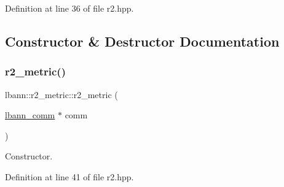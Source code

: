 Definition at line 36 of file r2.\+hpp.



\subsection{Constructor \& Destructor Documentation}
\mbox{\label{classlbann_1_1r2__metric_a9c6bffbb4724c77a8e6f8b1a2e7b27c7}} 
\subsubsection{\texorpdfstring{r2\+\_\+metric()}{r2\_metric()}\hspace{0.1cm}{\footnotesize\ttfamily [1/2]}}
{\footnotesize\ttfamily lbann\+::r2\+\_\+metric\+::r2\+\_\+metric (\begin{DoxyParamCaption}\item[{\hyperlink{classlbann_1_1lbann__comm}{lbann\+\_\+comm} $\ast$}]{comm }\end{DoxyParamCaption})\hspace{0.3cm}{\ttfamily [inline]}}

Constructor. 

Definition at line 41 of file r2.\+hpp.



